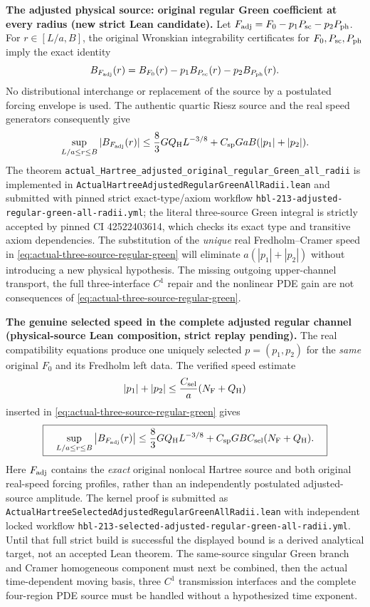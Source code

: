 \documentclass[11pt]{amsart}
\begin{document}
\medskip
\noindent\textbf{The adjusted physical source: original regular
Green coefficient at every radius (new strict Lean candidate).}
Let $F_{\rm adj}=F_0-p_1P_{\rm sc}-p_2P_{\rm ph}$.
For $r\in[L/a,B]$, the original Wronskian integrability certificates
for $F_0,P_{\rm sc},P_{\rm ph}$ imply the exact identity
\[
 B_{F_{\rm adj}}(r)=
 B_{F_0}(r)-p_1 B_{P_{\rm sc}}(r)-p_2B_{P_{\rm ph}}(r).
\]
No distributional interchange or replacement of the source by a
postulated forcing envelope is used. The authentic quartic Riesz
source and the real speed generators consequently give
\begin{equation}
 \sup_{L/a\le r\le B}|B_{F_{\rm adj}}(r)|
 \le \frac83 GQ_{\rm H}L^{-3/8}
  +C_{\rm sp}GaB(|p_1|+|p_2|).
 \label{eq:actual-three-source-regular-green}
\end{equation}
The theorem
\texttt{actual\_Hartree\_adjusted\_original\_regular\_Green\_all\_radii}
is implemented in
\texttt{ActualHartreeAdjustedRegularGreenAllRadii.lean} and
submitted with pinned strict exact-type/axiom workflow
\texttt{hbl-213-adjusted-regular-green-all-radii.yml};
the literal three-source Green integral is strictly accepted by pinned CI 42522403614, which checks its exact type and transitive axiom dependencies. The substitution of
the \emph{unique} real Fredholm--Cramer speed in
\eqref{eq:actual-three-source-regular-green}
will eliminate $a(|p_1|+|p_2|)$ without introducing a new physical
hypothesis. The missing outgoing upper-channel transport, the
full three-interface $C^1$ repair and the nonlinear PDE gain
are not consequences of \eqref{eq:actual-three-source-regular-green}.


\medskip
\noindent\textbf{The genuine selected speed in the complete adjusted
regular channel (physical-source Lean composition, strict replay pending).}
The real compatibility equations produce one uniquely selected
$p=(p_1,p_2)$ for the \emph{same} original $F_0$ and its Fredholm
left data. The verified speed estimate
\[
 |p_1|+|p_2|\le \frac{C_{\rm sel}}{a}
    (N_{\rm F}+Q_{\rm H})
\]
inserted in \eqref{eq:actual-three-source-regular-green} gives
\begin{equation}
 \boxed{\quad\sup_{L/a\le r\le B}
 \left|B_{F_{\rm adj}}(r)\right|
 \le \frac83 GQ_{\rm H}L^{-3/8}
   +C_{\rm sp}GBC_{\rm sel}(N_{\rm F}+Q_{\rm H}).\quad}
 \label{eq:original-unique-selected-adjusted-regular}
\end{equation}
Here $F_{\rm adj}$ contains the \emph{exact} original nonlocal Hartree
source and both original real-speed forcing profiles, rather than
an independently postulated adjusted-source amplitude.
The kernel proof is submitted as
\texttt{ActualHartreeSelectedAdjustedRegularGreenAllRadii.lean}
with independent locked workflow
\texttt{hbl-213-selected-adjusted-regular-green-all-radii.yml}.
Until that full strict build is successful the displayed bound is a
derived analytical target, not an accepted Lean theorem.
The same-source singular Green branch and Cramer homogeneous component
must next be combined, then the actual time-dependent moving basis,
three $C^1$ transmission interfaces and the complete four-region PDE
source must be handled without a hypothesized time exponent.
\end{document}

